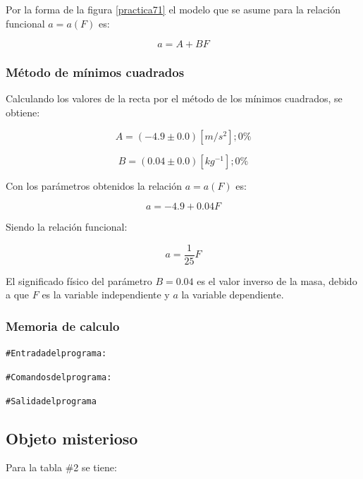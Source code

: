 \documentclass[letter,11pt]{article}
\begin{document}
Por la forma de la figura \ref{practica71} el modelo que se asume para la
relación funcional $a = a(F)$ es:

\begin{equation*}
    a = A + B F
\end{equation*}

\subsubsection{Método de mínimos cuadrados}

Calculando los valores de la recta por el método de los mínimos cuadrados, se
obtiene:

\begin{equation*}
    A = (-4.9 \pm 0.0)[m/s^2];0\%
\end{equation*}

\begin{equation*}
    B = (0.04 \pm 0.0)[kg^{-1}];0\%
\end{equation*}

Con los parámetros obtenidos la relación $a = a(F)$ es:

\begin{equation}
    a = - 4.9 + 0.04 F
\end{equation}

Siendo la relación funcional:

\begin{equation}
    a = \frac{1}{25} F
\end{equation}

El significado físico del parámetro $B = 0.04$ es el valor inverso de la masa,
debido a que $F$ es la variable independiente y $a$ la variable dependiente.

\subsubsection{Memoria de calculo}

\begin{shaded}
\begin{alltt}
\footnotesize
\# Entrada del programa:


\# Comandos del programa:


\# Salida del programa

\normalsize
\end{alltt}
\end{shaded}

\subsection{Objeto misterioso}
Para la tabla \#2 se tiene:
\end{document}

